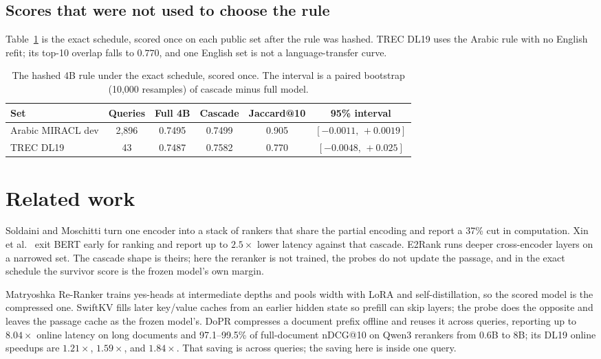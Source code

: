 \documentclass[11pt, a4paper]{article}
\begin{document}
\subsection{Scores that were not used to choose the rule}

Table~\ref{tab:public} is the exact schedule, scored once on each public set after the rule was hashed.
TREC DL19 uses the Arabic rule with no English refit; its top-10 overlap falls to $0.770$, and one English set is not a language-transfer curve.

\begin{table}[t]
\centering
\caption{The hashed 4B rule under the exact schedule, scored once. The interval is a paired bootstrap (10,000 resamples) of cascade minus full model.}
\label{tab:public}
\begin{tabular}{lccccc}
\toprule
Set & Queries & Full 4B & Cascade & Jaccard@10 & 95\% interval \\
\midrule
Arabic MIRACL dev & 2,896 & 0.7495 & 0.7499 & 0.905 & $[-0.0011,\, +0.0019]$ \\
TREC DL19 & 43 & 0.7487 & 0.7582 & 0.770 & $[-0.0048,\, +0.025]$ \\
\bottomrule
\end{tabular}
\end{table}

\section{Related work}

Soldaini and Moschitti \cite{soldaini2020cascade} turn one encoder into a stack of rankers that share the partial encoding and report a 37\% cut in computation.
Xin et al.\ \cite{xin2020early} exit BERT early for ranking and report up to $2.5\times$ lower latency against that cascade.
E2Rank \cite{campagnano2025e2rank} runs deeper cross-encoder layers on a narrowed set.
The cascade shape is theirs; here the reranker is not trained, the probes do not update the passage, and in the exact schedule the survivor score is the frozen model's own margin.

Matryoshka Re-Ranker \cite{liu2025matryoshka} trains yes-heads at intermediate depths and pools width with LoRA and self-distillation, so the scored model is the compressed one.
SwiftKV \cite{swiftkv2024} fills later key/value caches from an earlier hidden state so prefill can skip layers; the probe does the opposite and leaves the passage cache as the frozen model's.
DoPR \cite{dai2026dopr} compresses a document prefix offline and reuses it across queries, reporting up to $8.04\times$ online latency on long documents and 97.1--99.5\% of full-document nDCG@10 on Qwen3 rerankers from 0.6B to 8B; its DL19 online speedups are $1.21\times$, $1.59\times$, and $1.84\times$.
That saving is across queries; the saving here is inside one query.
\end{document}
